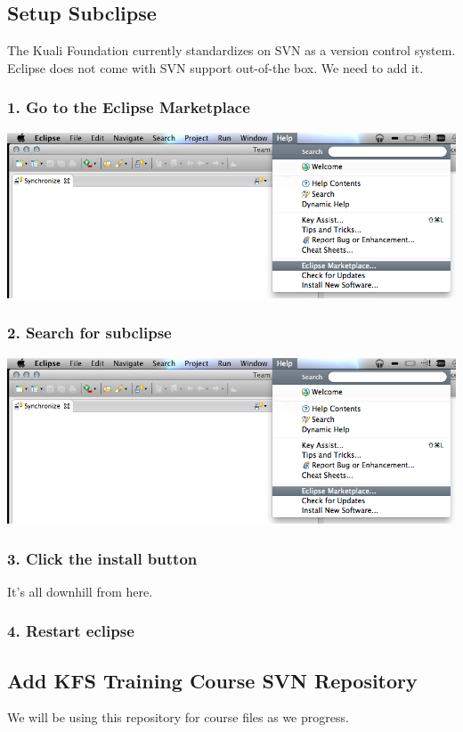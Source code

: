 \documentclass[12pt,notitlepage]{article}
\begin{document}
\subsection*{Setup Subclipse}
The Kuali Foundation currently standardizes on SVN as a version control system. Eclipse does not come with SVN support out-of-the box. We need to add it.
\subsubsection*{1. Go to the Eclipse Marketplace}
\includegraphics[width=\textwidth]{screenshots/Lesson1_2SS3.png}

\subsubsection*{2. Search for subclipse}
\includegraphics[width=\textwidth]{screenshots/Lesson1_2SS3.png}

\subsubsection*{3. Click the install button}
It's all downhill from here. 

\subsubsection*{4. Restart eclipse}

\subsection*{Add KFS Training Course SVN Repository}
We will be using this repository for course files as we progress.
\end{document}
